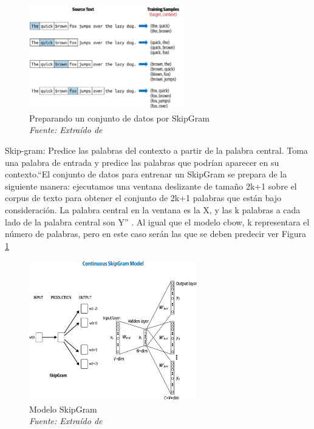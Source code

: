 \begin{itemize}
\begin{itemize}
\begin{figure}[h!]
	\includegraphics[width=0.6\textwidth]{capitulo3/figuras/nlp5.png}
	\caption[Preparando un conjunto de datos por SkipGram]{Preparando un conjunto de datos por SkipGram
		\\\textit{Fuente: Extraído de} \protect\cite[p. 101]{vajjala2020practical}}
	\label{fig:nlp5}
\end{figure}

Skip-gram: Predice las palabras del contexto a partir de la palabra central. Toma una palabra de entrada y predice las palabras que podrían aparecer en su contexto.``El conjunto de datos para entrenar un SkipGram se prepara de la siguiente manera: ejecutamos una ventana deslizante de tamaño 2k+1 sobre el corpus de texto para obtener el conjunto de 2k+1 palabras que están bajo consideración. La palabra central en la ventana es la X, y las k palabras a cada lado de la palabra central son Y'' \cite[p. 101]{vajjala2020practical}. Al igual que el modelo cbow, k representara el número de palabras, pero en este caso serán las que se deben predecir ver Figura \ref{fig:nlp5}



\begin{figure}[h!]
	\includegraphics[width=0.65\textwidth]{capitulo3/figuras/nlp6.png}
	\caption[Modelo SkipGram]{Modelo SkipGram
		\\\textit{Fuente: Extraído de} \protect\cite[p. 102]{vajjala2020practical}}
	\label{fig:nlp6}
\end{figure}


\end{itemize}
\end{itemize}
